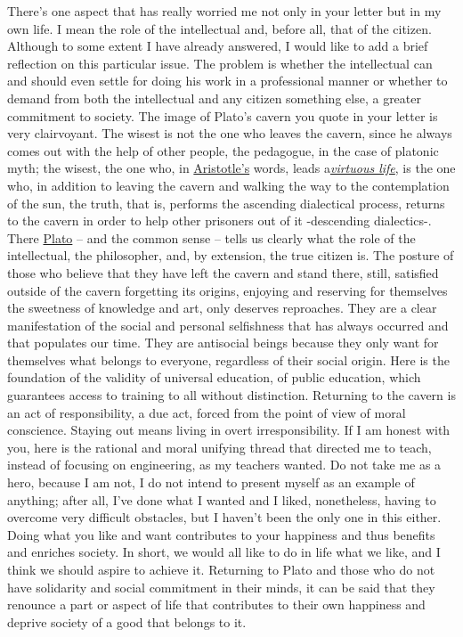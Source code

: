 \documentclass[]{book}
\begin{document}
There's one aspect that has really worried me not only in your letter but in my own life. I mean the role of the intellectual and, before all, that of the citizen. Although to some extent I have already answered, I would like to add a brief reflection on this particular issue. The problem is whether the intellectual can and should even settle for doing his work in a professional manner or whether to demand from both the intellectual and any citizen something else, a greater commitment to society. The image of Plato's cavern you quote in your letter is very clairvoyant. The wisest is not the one who leaves the cavern, since he always comes out with the help of other people, the pedagogue, in the case of platonic myth; the wisest, the one who, in \href{https://en.wikipedia.org/wiki/Aristotle}{Aristotle's} words, leads a\href{https://en.wikipedia.org/wiki/Nicomachean_Ethics}{\emph{virtuous life}}, is the one who, in addition to leaving the cavern and walking the way to the contemplation of the sun, the truth, that is, performs the ascending dialectical process, returns to the cavern in order to help other prisoners out of it -descending dialectics-. There \href{https://en.wikipedia.org/wiki/Plato}{Plato} -- and the common sense -- tells us clearly what the role of the intellectual, the philosopher, and, by extension, the true citizen is. The posture of those who believe that they have left the cavern and stand there, still, satisfied outside of the cavern forgetting its origins, enjoying and reserving for themselves the sweetness of knowledge and art, only deserves reproaches. They are a clear manifestation of the social and personal selfishness that has always occurred and that populates our time. They are antisocial beings because they only want for themselves what belongs to everyone, regardless of their social origin. Here is the foundation of the validity of universal education, of public education, which guarantees access to training to all without distinction. Returning to the cavern is an act of responsibility, a due act, forced from the point of view of moral conscience. Staying out means living in overt irresponsibility. If I am honest with you, here is the rational and moral unifying thread that directed me to teach, instead of focusing on engineering, as my teachers wanted. Do not take me as a hero, because I am not, I do not intend to present myself as an example of anything; after all, I've done what I wanted and I liked, nonetheless, having to overcome very difficult obstacles, but I haven't been the only one in this either. Doing what you like and want contributes to your happiness and thus benefits and enriches society. In short, we would all like to do in life what we like, and I think we should aspire to achieve it. Returning to Plato and those who do not have solidarity and social commitment in their minds, it can be said that they renounce a part or aspect of life that contributes to their own happiness and deprive society of a good that belongs to it.
\end{document}
